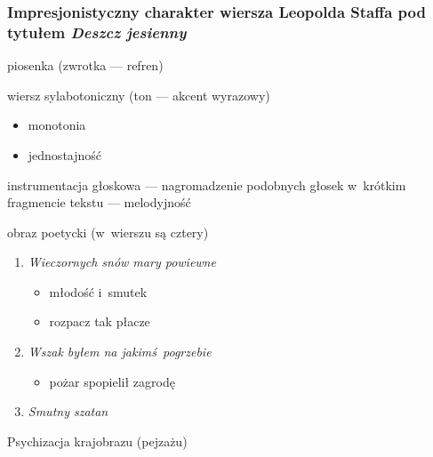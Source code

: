 \subsubsection*{Impresjonistyczny charakter wiersza Leopolda Staffa pod tytułem \textit{Deszcz jesienny}}
\begin{description}
    \item piosenka (zwrotka --- refren)
    \item wiersz sylabotoniczny (ton --- akcent wyrazowy)
        \begin{itemize}
            \item monotonia
            \item jednostajność
        \end{itemize}
    \item instrumentacja głoskowa --- nagromadzenie podobnych głosek w~krótkim fragmencie tekstu --- melodyjność
    \item obraz poetycki (w~wierszu są cztery)
        \begin{enumerate}
            \item \textit{Wieczornych snów mary powiewne}
                \begin{itemize}
                    \item młodość i~smutek
                    \item rozpacz tak płacze
                \end{itemize}
            \item \textit{Wszak byłem na jakimś pogrzebie}
                \begin{itemize}
                    \item pożar spopielił zagrodę
                \end{itemize}
            \item \textit{Smutny szatan}
        \end{enumerate}
    \item Psychizacja krajobrazu (pejzażu)
\end{description}
